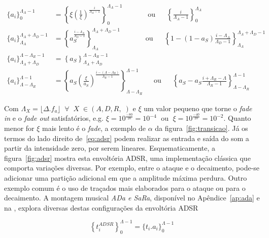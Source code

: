\begin{equation}\label{eq:adsr}
\begin{split}
\{a_i\}_0^{\Lambda_A-1} & = \left\{\xi\left(\frac{1}{\xi}\right)^{\frac{i}{\Lambda_A-1}}\right\}_0^{\Lambda_A-1} \;\;\quad\quad\quad \text{ou} \;\;\quad \left\{\frac{i}{\Lambda_A-1}\right\}_0^{\Lambda_A}\\
\{a_i\}_{\Lambda_A}^{\Lambda_A+\Lambda_D-1} & =\left\{a_S^{\frac{i-\Lambda_A}{\Lambda_D-1}}  \right\}_{\Lambda_A}^{\Lambda_A+\Lambda_D-1} \;\;\quad \quad\quad \text{ou} \quad\;\; \left\{1-(1-a_S)\frac{i-\Lambda_A}{\Lambda_D-1}\right\}_{\Lambda_A}^{\Lambda_A+\Lambda_D-1}\\
\{ a_i \}_{\Lambda_A+\Lambda_D}^{\Lambda-\Lambda_R-1} & =\left\{ a_S \right\}_{\Lambda_A+\Lambda_D}^{\Lambda-\Lambda_R-1} \\
\{ a_i \}_{\Lambda-\Lambda_R}^{\Lambda-1} & =\left\{ a_S\left(\frac{\xi}{a_S} \right)^{\frac{i-(\Lambda-\Lambda_R)}{\Lambda_R-1}} \right\}_{\Lambda-\Lambda_R}^{\Lambda-1} \quad\;\; \text{ou} \quad\;\; \left\{ a_S - a_S\frac{i+\Lambda_R-\Lambda}{\Lambda_R-1}\right\}_{\Lambda-\Lambda_R}^{\Lambda-1} 
\end{split}
\end{equation}

Com $\Lambda_X=\lfloor \Delta . f_a \rfloor\;\;\forall\;\; X \; \in (A,D,R,\;)$ e $\xi$ um valor pequeno que torne o \emph{fade in} e o \emph{fade out} satisfatórios, e.g. $\xi=10^{\frac{-80}{20}}=10^{-4}\;$ ou $\;\xi=10^{\frac{-40}{20}}=10^{-2}$. Quanto menor for $\xi$ mais lento é o \emph{fade}, a exemplo de $\alpha$ da figura~\ref{fig:transicao}. Já os termos do lado direito de~\ref{eq:adsr} podem realizar as entrada e saída do som a partir da intensidade zero, por serem lineares. 
Esquematicamente, a figura~\ref{fig:adsr} mostra esta envoltória ADSR, 
uma implementação clássica que comporta variações diversas. Por exemplo,
entre o ataque e o decaimento, pode-se adicionar uma partição adicional em que a amplitude
máxima perdura. Outro exemplo comum é o uso de traçados mais elaborados para o
ataque ou para o decaimento. A montagem musical \emph{ADa e SaRa}, disponível no Apêndice~\ref{ap:ada}
e na \massa, explora diversas destas configurações da envoltória ADSR


\begin{equation}\label{eq:adsrApl}
\left\{t_i^{ADSR}\right\}_0^{\Lambda-1} =\{t_i . a_i\}_0^{\Lambda-1}
\end{equation}

